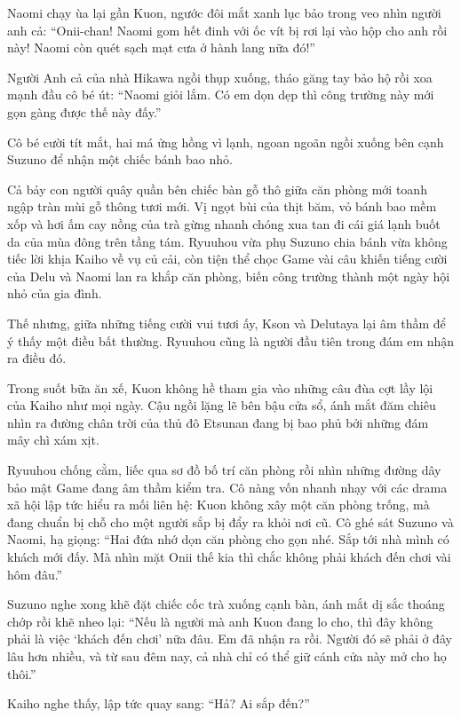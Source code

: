 ﻿\documentclass[../main.tex]{subfiles}
\begin{document}
Naomi chạy ùa lại gần Kuon, ngước đôi mắt xanh lục bảo trong veo nhìn người anh cả: ``Onii-chan! Naomi gom hết đinh với ốc vít bị rơi lại vào hộp cho anh rồi này! Naomi còn quét sạch mạt cưa ở hành lang nữa đó!''

Người Anh cả của nhà Hikawa ngồi thụp xuống, tháo găng tay bảo hộ rồi xoa mạnh đầu cô bé út: ``Naomi giỏi lắm. Có em dọn dẹp thì công trường này mới gọn gàng được thế này đấy.''

Cô bé cười tít mắt, hai má ửng hồng vì lạnh, ngoan ngoãn ngồi xuống bên cạnh Suzuno để nhận một chiếc bánh bao nhỏ.

Cả bảy con người quây quần bên chiếc bàn gỗ thô giữa căn phòng mới toanh ngập tràn mùi gỗ thông tươi mới. Vị ngọt bùi của thịt băm, vỏ bánh bao mềm xốp và hơi ấm cay nồng của trà gừng nhanh chóng xua tan đi cái giá lạnh buốt da của mùa đông trên tầng tám. Ryuuhou vừa phụ Suzuno chia bánh vừa không tiếc lời khịa Kaiho về vụ củ cải, còn tiện thể chọc Game vài câu khiến tiếng cười của Delu và Naomi lan ra khắp căn phòng, biến công trường thành một ngày hội nhỏ của gia đình.

\ct

Thế nhưng, giữa những tiếng cười vui tươi ấy, Kson và Delutaya lại âm thầm để ý thấy một điều bất thường. Ryuuhou cũng là người đầu tiên trong đám em nhận ra điều đó.

Trong suốt bữa ăn xế, Kuon không hề tham gia vào những câu đùa cợt lầy lội của Kaiho như mọi ngày. Cậu ngồi lặng lẽ bên bậu cửa sổ, ánh mắt đăm chiêu nhìn ra đường chân trời của thủ đô Etsunan đang bị bao phủ bởi những đám mây chì xám xịt.

Ryuuhou chống cằm, liếc qua sơ đồ bố trí căn phòng rồi nhìn những đường dây bảo mật Game đang âm thầm kiểm tra. Cô nàng vốn nhanh nhạy với các drama xã hội lập tức hiểu ra mối liên hệ: Kuon không xây một căn phòng trống, mà đang chuẩn bị chỗ cho một người sắp bị đẩy ra khỏi nơi cũ. Cô ghé sát Suzuno và Naomi, hạ giọng: ``Hai đứa nhớ dọn căn phòng cho gọn nhé. Sắp tới nhà mình có khách mới đấy. Mà nhìn mặt Onii thế kia thì chắc không phải khách đến chơi vài hôm đâu.''

Suzuno nghe xong khẽ đặt chiếc cốc trà xuống cạnh bàn, ánh mắt dị sắc thoáng chớp rồi khẽ nheo lại: ``Nếu là người mà anh Kuon đang lo cho, thì đây không phải là việc `khách đến chơi' nữa đâu. Em đã nhận ra rồi. Người đó sẽ phải ở đây lâu hơn nhiều, và từ sau đêm nay, cả nhà chỉ có thể giữ cánh cửa này mở cho họ thôi.''

Kaiho nghe thấy, lập tức quay sang: ``Hả? Ai sắp đến?''
\end{document}
